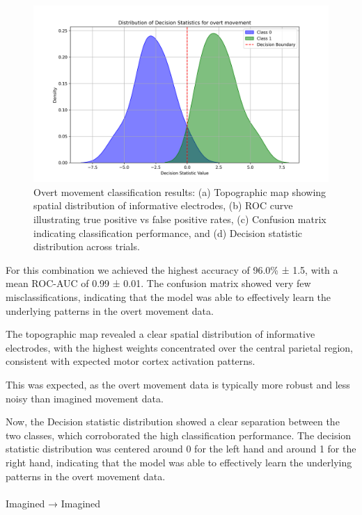 \documentclass[
  letterpaper,
  DIV=11,
  numbers=noendperiod]{scrartcl}
\makeatletter
\let\oldparagraph\paragraph
\renewcommand{\paragraph}{
    \@ifstar
      \xxxParagraphStar
      \xxxParagraphNoStar
  }
\newcommand{\xxxParagraphStar}[1]{\oldparagraph*{#1}\mbox{}}
\newcommand{\xxxParagraphNoStar}[1]{\oldparagraph{#1}\mbox{}}
\makeatother
\begin{document}
\begin{figure}
{\includegraphics[width=1\textwidth,height=\textheight]{figures/cross-validated-results/linear/overt-overt-decision-statistic.png}

}

\caption{\label{fig-overt-overt-results}Overt movement classification
results: (a) Topographic map showing spatial distribution of informative
electrodes, (b) ROC curve illustrating true positive vs false positive
rates, (c) Confusion matrix indicating classification performance, and
(d) Decision statistic distribution across trials.}

\end{figure}%

For this combination we achieved the highest accuracy of 96.0\% ± 1.5,
with a mean ROC-AUC of 0.99 ± 0.01. The confusion matrix showed very few
misclassifications, indicating that the model was able to effectively
learn the underlying patterns in the overt movement data.

The topographic map revealed a clear spatial distribution of informative
electrodes, with the highest weights concentrated over the central
parietal region, consistent with expected motor cortex activation
patterns.

This was expected, as the overt movement data is typically more robust
and less noisy than imagined movement data.

Now, the Decision statistic distribution showed a clear separation
between the two classes, which corroborated the high classification
performance. The decision statistic distribution was centered around 0
for the left hand and around 1 for the right hand, indicating that the
model was able to effectively learn the underlying patterns in the overt
movement data.

\paragraph{Imagined → Imagined}\label{imagined-imagined}
\end{document}

